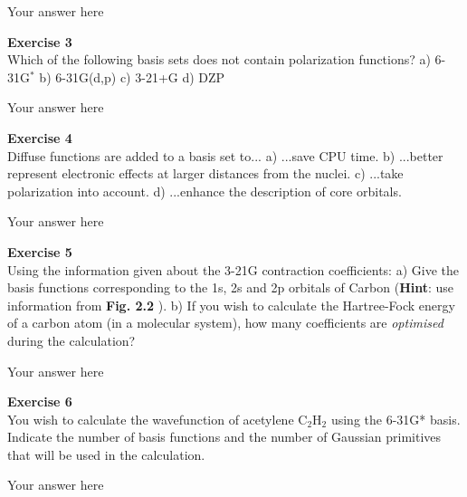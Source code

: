 \documentclass{article}
\begin{document}
Your answer here

\begin{mdframed}
\textbf{Exercise 3}\\
Which of the following basis sets does not contain polarization functions?\newline
a) 6-31G$^\ast$\newline
b) 6-31G(d,p)\newline
c) 3-21+G\newline
d) DZP
\end{mdframed}

Your answer here

\begin{mdframed}
\textbf{Exercise 4}\\
Diffuse functions are added to a basis set to...\newline
a) ...save CPU time.\newline
b) ...better represent electronic effects at larger distances from the nuclei.\newline
c) ...take polarization into account.\newline
d) ...enhance the description of core orbitals.
\end{mdframed}

Your answer here

\begin{mdframed}
\textbf{Exercise 5}\\
Using the information given about the 3-21G contraction coefficients:\newline
a) Give the basis functions corresponding to the 1s, 2s and 2p orbitals of Carbon (\textbf{Hint}: use information from \textbf{Fig. 2.2} ).\newline
b) If you wish to calculate the Hartree-Fock energy of a carbon atom (in a molecular system),
how many coefficients are \textit{optimised} during the calculation?
\end{mdframed}

Your answer here

\begin{mdframed}
\textbf{Exercise 6}\\
You wish to calculate the wavefunction of acetylene C$_2$H$_2$ using the 6-31G* basis. \newline
Indicate the number of basis functions and the number of Gaussian primitives that will be used in the calculation.
\end{mdframed}

Your answer here
\end{document}

